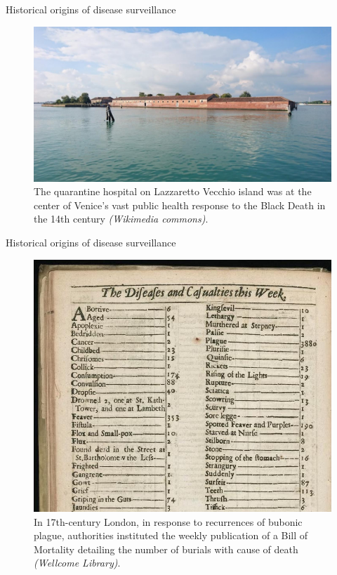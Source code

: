 \documentclass[
  ignorenonframetext,
]{beamer}
\begin{document}
\begin{frame}{Historical origins of disease surveillance}
\protect\hypertarget{historical-origins-of-disease-surveillance}{}
\begin{figure}
\centering
\includegraphics[width=\linewidth]{figures/isolation_hospital_lazzaretto_vecchio_wikicommons.jpg}
\caption{The quarantine hospital on Lazzaretto Vecchio island was at the center of Venice's vast \alert{public health response} to the Black Death in the 14th century \textit{(Wikimedia commons)}.}
\end{figure}
\end{frame}

\begin{frame}{Historical origins of disease surveillance}
\protect\hypertarget{historical-origins-of-disease-surveillance-1}{}
\begin{figure}
\centering
\includegraphics[width=.7\linewidth]{figures/london_bill_of_mortality_1664.jpg}
\caption{In 17th-century London, in response to recurrences of bubonic plague, authorities instituted the weekly publication of a \alert{Bill of Mortality} detailing the number of burials with cause of death \textit{(Wellcome Library)}.}
\end{figure}
\end{frame}
\end{document}
